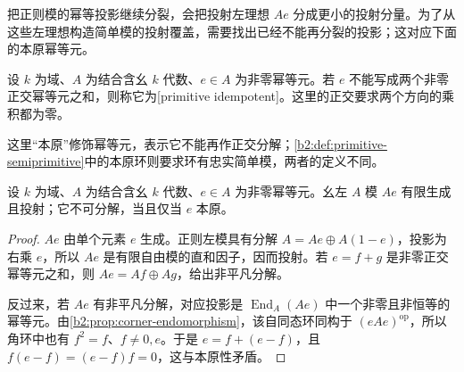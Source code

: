 把正则模的幂等投影继续分裂，会把投射左理想 \(Ae\) 分成更小的投射分量。为了从这些左理想构造简单模的投射覆盖，需要找出已经不能再分裂的投影；这对应下面的本原幂等元。

\begin{definition}\label{b2:def:primitive-idempotent}
	设 \(k\) 为域、\(A\) 为结合含幺 \(k\) 代数、\(e\in A\) 为非零幂等元。若 \(e\) 不能写成两个非零正交幂等元之和，则称它为[primitive idempotent]。这里的正交要求两个方向的乘积都为零。
\end{definition}

这里“本原”修饰幂等元，表示它不能再作正交分解；\cref{b2:def:primitive-semiprimitive}中的本原环则要求环有忠实简单模，两者的定义不同。

\begin{proposition}\label{b2:prop:primitive-projective-indecomposable}
	设 \(k\) 为域、\(A\) 为结合含幺 \(k\) 代数、\(e\in A\) 为非零幂等元。幺左 \(A\) 模 \(Ae\) 有限生成且投射；它不可分解，当且仅当 \(e\) 本原。
\end{proposition}
\begin{proof}
	\(Ae\) 由单个元素 \(e\) 生成。正则左模具有分解 \(A=Ae\oplus A(1-e)\)，投影为右乘 \(e\)，所以 \(Ae\) 是有限自由模的直和因子，因而投射。若 \(e=f+g\) 是非零正交幂等元之和，则 \(Ae=Af\oplus Ag\)，给出非平凡分解。

	反过来，若 \(Ae\) 有非平凡分解，对应投影是 \(\operatorname{End}_A(Ae)\) 中一个非零且非恒等的幂等元。由\cref{b2:prop:corner-endomorphism}，该自同态环同构于 \((eAe)^{\mathrm{op}}\)，所以角环中也有 \(f^2=f\)、\(f\ne0,e\)。于是 \(e=f+(e-f)\)，且 \(f(e-f)=(e-f)f=0\)，这与本原性矛盾。
\end{proof}

